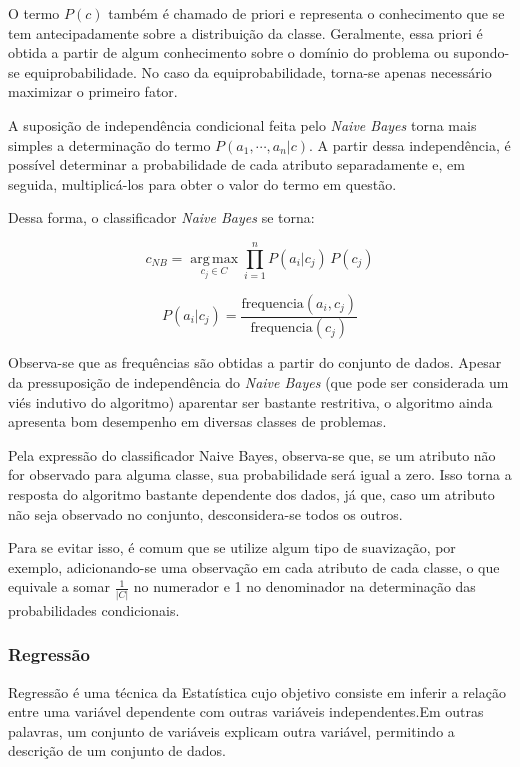 \documentclass{article}
\begin{document}
O termo $P(c)$ também é chamado de priori e representa o conhecimento que se tem antecipadamente sobre a distribuição da classe. Geralmente, essa priori é obtida a partir de algum conhecimento sobre o domínio do problema ou supondo-se equiprobabilidade. No caso da equiprobabilidade, torna-se apenas necessário maximizar o primeiro fator.

A suposição de independência condicional feita pelo {\it Naive Bayes} torna mais simples a determinação do termo $P(a_1,\cdots,a_n|c)$. A partir dessa independência, é possível determinar a probabilidade de cada atributo separadamente e, em seguida, multiplicá-los para obter o valor do termo em questão.

Dessa forma, o classificador {\it Naive Bayes} se torna:

\begin{equation}
c_{NB} = \operatorname*{arg\,max}_{c_j \in C} \prod_{i=1}^n P(a_i|c_j) \, P(c_j)
\end{equation}

\begin{equation}
P(a_i|c_j) = \frac{\mathrm{frequencia}(a_i,c_j)}{\mathrm{frequencia}(c_j)}
\end{equation}

Observa-se que as frequências são obtidas a partir do conjunto de dados. Apesar da pressuposição de independência do {\it Naive Bayes} (que pode ser considerada um viés indutivo do algoritmo) aparentar ser bastante restritiva, o algoritmo ainda apresenta bom desempenho em diversas classes de problemas.

Pela expressão do classificador Naive Bayes, observa-se que, se um atributo não for observado para alguma classe, sua probabilidade será igual a zero. Isso torna a resposta do algoritmo bastante dependente dos dados, já que, caso um atributo não seja observado no conjunto, desconsidera-se todos os outros.

Para se evitar isso, é comum que se utilize algum tipo de suavização, por exemplo, adicionando-se uma observação em cada atributo de cada classe, o que equivale a somar $\frac{1}{|C|}$ no numerador e 1 no denominador na determinação das probabilidades condicionais.

\subsubsection{Regressão}

Regressão é uma técnica da Estatística cujo objetivo consiste em inferir a relação entre uma variável dependente com outras variáveis independentes.Em outras palavras, um conjunto de variáveis explicam outra variável, permitindo a descrição de um conjunto de dados.
\end{document}
